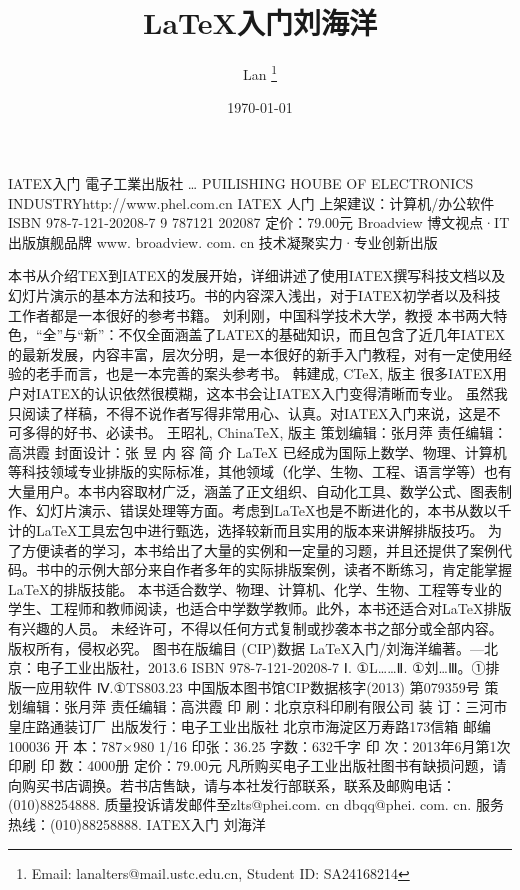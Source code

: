 \documentclass[UTF8]{ctexart}
\title{\LaTeX 入门刘海洋}
\author[1,2]{Lan \footnote{Email: lanalters@mail.ustc.edu.cn, Student ID: SA24168214}}
\affil[1]{中国科学技术大学, 合肥 230026}
\affil[2]{中国科学院合肥物质科学研究院\,等离子体物理研究所, 合肥 230031}
\date{\today}
\begin{document}
\maketitle
\tableofcontents

IATEX入门
電子工業出版社
…
PUILISHING HOUBE OF ELECTRONICS INDUSTRYhttp://www.phel.com.cn
IATEX
人门
上架建议：计算机/办公软件
ISBN 978-7-121-20208-7
9 787121 202087
定价：79.00元
Broadview	博文视点·IT出版旗舰品牌
www. broadview. com. cn	技术凝聚实力·专业创新出版

本书从介绍TEX到IATEX的发展开始，详细讲述了使用IATEX撰写科技文档以及幻灯片演示的基本方法和技巧。书的内容深入浅出，对于IATEX初学者以及科技工作者都是一本很好的参考书籍。
刘利刚，中国科学技术大学，教授
本书两大特色，“全”与“新”：不仅全面涵盖了LATEX的基础知识，而且包含了近几年IATEX的最新发展，内容丰富，层次分明，是一本很好的新手入门教程，对有一定使用经验的老手而言，也是一本完善的案头参考书。
韩建成, CTeX, 版主
很多IATEX用户对IATEX的认识依然很模糊，这本书会让IATEX入门变得清晰而专业。
虽然我只阅读了样稿，不得不说作者写得非常用心、认真。对IATEX入门来说，这是不可多得的好书、必读书。
王昭礼, ChinaTeX, 版主
策划编辑：张月萍
责任编辑：高洪霞
封面设计：张	昱
内	容	简	介
LaTeX 已经成为国际上数学、物理、计算机等科技领域专业排版的实际标准，其他领域（化学、生物、工程、语言学等）也有大量用户。本书内容取材广泛，涵盖了正文组织、自动化工具、数学公式、图表制作、幻灯片演示、错误处理等方面。考虑到LaTeX也是不断进化的，本书从数以千计的LaTeX工具宏包中进行甄选，选择较新而且实用的版本来讲解排版技巧。
为了方便读者的学习，本书给出了大量的实例和一定量的习题，并且还提供了案例代码。书中的示例大部分来自作者多年的实际排版案例，读者不断练习，肯定能掌握LaTeX的排版技能。
本书适合数学、物理、计算机、化学、生物、工程等专业的学生、工程师和教师阅读，也适合中学数学教师。此外，本书还适合对LaTeX排版有兴趣的人员。
未经许可，不得以任何方式复制或抄袭本书之部分或全部内容。
版权所有，侵权必究。
图书在版编目 (CIP)数据
LaTeX入门/刘海洋编著。—北京：电子工业出版社，2013.6
ISBN 978-7-121-20208-7
Ⅰ. ①L……Ⅱ. ①刘…Ⅲ。①排版一应用软件 Ⅳ.①TS803.23
中国版本图书馆CIP数据核字(2013) 第079359号
策划编辑：张月萍
责任编辑：高洪霞
印   刷：北京京科印刷有限公司
装   订：三河市皇庄路通装订厂
出版发行：电子工业出版社
北京市海淀区万寿路173信箱  邮编100036
开   本：787×980  1/16  印张：36.25  字数：632千字
印   次：2013年6月第1次印刷
印   数：4000册   定价：79.00元
凡所购买电子工业出版社图书有缺损问题，请向购买书店调换。若书店售缺，请与本社发行部联系，联系及邮购电话：(010)88254888.
质量投诉请发邮件至zlts@phei.com. cn                       dbqq@phei. com. cn.
服务热线：(010)88258888.
IATEX入门
刘海洋
\end{document}
